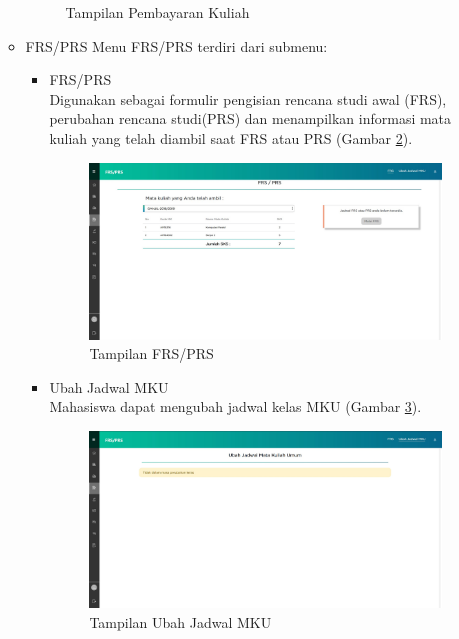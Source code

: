 \begin{enumerate}
\begin{itemize}
\begin{figure}[H]
			\caption{Tampilan Pembayaran Kuliah}
			\label{fig:studentportal_pembayaran_kuliah}
		\end{figure}
		\item FRS/PRS
		Menu FRS/PRS terdiri dari submenu:
		\begin{itemize}
			\item FRS/PRS \\
			Digunakan sebagai formulir pengisian rencana studi awal (FRS), perubahan rencana studi(PRS) dan menampilkan informasi mata kuliah yang telah diambil saat FRS atau PRS (Gambar \ref{fig:studentportal_frs_prs}).
			\begin{figure}[H]
				\centering
				\includegraphics[scale=0.3]{Gambar/studentportal_frs_prs}
				\caption{Tampilan FRS/PRS}
				\label{fig:studentportal_frs_prs}
			\end{figure}
			\item Ubah Jadwal MKU \\
			Mahasiswa dapat mengubah jadwal kelas MKU (Gambar \ref{fig:studentportal_ubah_jadwal_mku}).
			\begin{figure}[H]
				\centering
				\includegraphics[scale=0.3]{Gambar/studentportal_ubah_jadwal_mku}
				\caption{Tampilan Ubah Jadwal MKU}
				\label{fig:studentportal_ubah_jadwal_mku}

\end{figure}
\end{itemize}
\end{itemize}
\end{enumerate}
